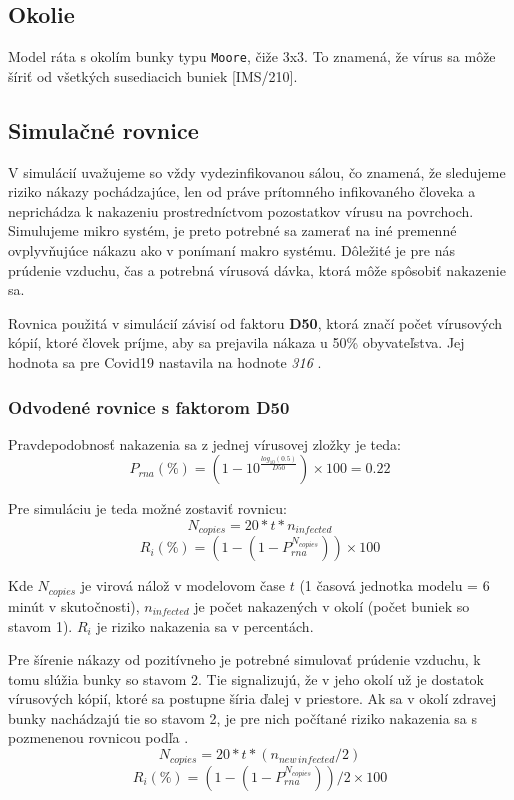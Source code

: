 \documentclass[a4paper, 11pt]{article}
\begin{document}
        \subsection{Okolie}
        Model ráta s okolím bunky typu \texttt{Moore}, čiže 3x3. To znamená, že vírus sa môže šíriť od všetkých susediacich buniek [IMS/210].
    
        \subsection{Simulačné rovnice}
        V simulácií uvažujeme so vždy vydezinfikovanou sálou, čo znamená, že sledujeme riziko nákazy pochádzajúce, len od práve prítomného infikovaného človeka a neprichádza k nakazeniu prostredníctvom pozostatkov vírusu na povrchoch. Simulujeme mikro systém, je preto potrebné sa zamerať na iné premenné ovplyvňujúce nákazu ako v ponímaní makro systému. Dôležité je pre nás prúdenie vzduchu, čas a potrebná vírusová dávka, ktorá môže spôsobiť nakazenie sa.   
        \par Rovnica použitá v simulácií závisí od faktoru \textbf{D50}, ktorá značí počet vírusových kópií, ktoré človek príjme, aby sa prejavila nákaza u 50\% obyvateľstva. Jej hodnota sa pre Covid19 nastavila na hodnote \textit{316} \cite{joslelieveldfrankhelleiset.al.2020}.
        
        \subsubsection{Odvodené rovnice s faktorom D50}
        Pravdepodobnosť nakazenia sa z jednej vírusovej zložky je teda:
        $$
            P_{rna} (\%) = (1 - 10^{\frac{log_{10}(0.5)}{D50}}) \times 100 = 0.22%
        $$
        
        Pre simuláciu je teda možné zostaviť rovnicu:
        $$
            N_{copies} =  20 * t * n_{infected} 
        $$
        $$
            R_{i} (\%) = (1 - (1 - P_{rna}^{N_{copies}})) \times 100
        $$
        
        Kde $N_{copies}$ je virová nálož v modelovom čase $t$ (1 časová jednotka modelu = 6 minút v skutočnosti), $n_{infected}$ je počet nakazených v okolí (počet buniek so stavom 1). $R_{i}$ je riziko nakazenia sa v percentách.
        
        Pre šírenie nákazy od pozitívneho je potrebné simulovať prúdenie vzduchu, k tomu slúžia bunky so stavom 2. Tie signalizujú, že v jeho okolí už je dostatok vírusových kópií, ktoré sa postupne šíria ďalej v priestore. Ak sa v okolí zdravej bunky nachádzajú tie so stavom 2, je pre nich počítané riziko nakazenia sa s pozmenenou rovnicou podľa  \cite{3feetrule}.
        $$
            N_{copies} =  20 * t * (n_{new\,infected} / 2) 
        $$
        $$
            R_{i} (\%) = (1 - (1 - P_{rna}^{N_{copies}})) / 2 \times 100
        $$
        
\end{document}
